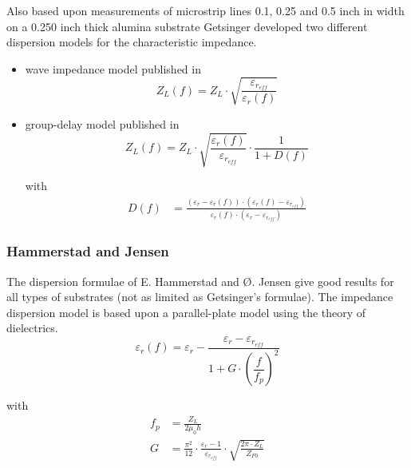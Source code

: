 \documentclass[10pt]{report}
\begin{document}
Also based upon measurements of microstrip lines 0.1, 0.25 and 0.5
inch in width on a 0.250 inch thick alumina substrate Getsinger
\cite{Getsinger2} developed two different dispersion models for the
characteristic impedance.

\begin{itemize}
\item wave impedance model published in \cite{Getsinger2}
\begin{equation}
Z_{L}(f) = Z_{L}\cdot\sqrt{\frac{\varepsilon_{r_{eff}}}{\varepsilon_{r}(f)}}
\end{equation}

\item group-delay model published in \cite{Getsinger3}
\begin{equation}
Z_{L}(f) = Z_{L}\cdot\sqrt{\frac{\varepsilon_{r}(f)}{\varepsilon_{r_{eff}}}}\cdot\frac{1}{1 + D(f)}
\end{equation}

with
\begin{align}
D(f) &= \frac{\left(\varepsilon_{r} - \varepsilon_{r}(f)\right)\cdot\left(\varepsilon_{r}(f) - \varepsilon_{r_{eff}}\right)}{\varepsilon_{r}(f)\cdot\left(\varepsilon_{r} - \varepsilon_{r_{eff}}\right)}
\end{align}
\end{itemize}

\subsubsection{Hammerstad and Jensen}

The dispersion formulae of E. Hammerstad and {\O}. Jensen
\cite{Hammerstad} give good results for all types of substrates (not
as limited as Getsinger's formulae).  The impedance dispersion model
is based upon a parallel-plate model using the theory of dielectrics.
\begin{equation}
\varepsilon_{r}(f) = \varepsilon_{r} - \frac{\varepsilon_{r} - \varepsilon_{r_{eff}}}{1 + G\cdot \left(\dfrac{f}{f_{p}}\right)^{2}}
\end{equation}

with
\begin{align}
f_{p} &= \frac{Z_{L}}{2\mu_{0} h}\\
G &= \frac{\pi^{2}}{12}\cdot\frac{\varepsilon_{r} - 1}{\varepsilon_{r_{eff}}}\cdot\sqrt{\frac{2\pi\cdot Z_{L}}{Z_{F0}}}
\end{align}
\end{document}
